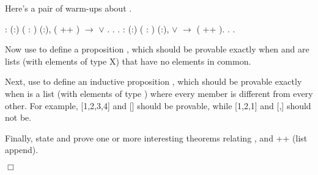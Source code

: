 \documentclass[12pt]{report}
\begin{document}
    Here's a pair of warm-ups about .
\begin{coqdoccode}
\coqdocemptyline
\coqdocnoindent
{}  : \coqdockw{\ensuremath{\forall}} (:) (  :  ) (:), \coqdoceol
\coqdocindent{2.50em}
  ( ++ ) \ensuremath{\rightarrow}    \ensuremath{\lor}   .\coqdoceol
\coqdocnoindent
{}.\coqdoceol
 .\coqdoceol
\coqdocemptyline
\coqdocnoindent
{}  : \coqdockw{\ensuremath{\forall}} (:) (  :  ) (:), \coqdoceol
\coqdocindent{2.50em}
   \ensuremath{\lor}    \ensuremath{\rightarrow}   ( ++ ).\coqdoceol
\coqdocnoindent
{}.\coqdoceol
 .\coqdoceol
\coqdocemptyline
\end{coqdoccode}
Now use  to define a proposition    ,
    which should be provable exactly when  and  are
    lists (with elements of type X) that have no elements in common. \begin{coqdoccode}
\coqdocemptyline
\coqdocemptyline
\end{coqdoccode}
Next, use  to define an inductive proposition
      , which should be provable exactly when  is a
    list (with elements of type ) where every member is different
    from every other.  For example,   [1,2,3,4] and
      [] should be provable, while  
    [1,2,1] and   [,] should not be.  \begin{coqdoccode}
\coqdocemptyline
\coqdocemptyline
\end{coqdoccode}
Finally, state and prove one or more interesting theorems relating
    ,  and ++ (list append).  \begin{coqdoccode}
\coqdocemptyline
\end{coqdoccode}
\ensuremath{\Box} 
\end{document}
